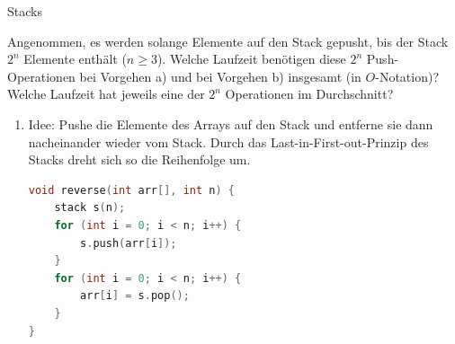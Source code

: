 \documentclass[11pt,a4paper]{article}
\begin{document}
\begin{aufgabe}{3}{Stacks}
\begin{enumerate}
        Angenommen, es werden solange Elemente auf den Stack gepusht, bis der Stack $2^n$ Elemente enthält ($n \geq 3$).
        Welche Laufzeit benötigen diese $2^n$ Push-Operationen bei Vorgehen a) und bei Vorgehen b) insgesamt (in $O$-Notation)?
        Welche Laufzeit hat jeweils eine der $2^n$ Operationen im Durchschnitt?
    \end{enumerate}
\end{aufgabe}

\begin{loesung}
    \begin{enumerate}
        \item Idee: Pushe die Elemente des Arrays auf den Stack und entferne sie dann nacheinander wieder vom Stack.
        Durch das Last-in-First-out-Prinzip des Stacks dreht sich so die Reihenfolge um.
        \begin{lstlisting}[language=c++]
void reverse(int arr[], int n) {
    stack s(n);
    for (int i = 0; i < n; i++) {
        s.push(arr[i]);
    }
    for (int i = 0; i < n; i++) {
        arr[i] = s.pop();
    }
}
        \end{lstlisting}


\end{enumerate}
\end{loesung}
\end{document}
